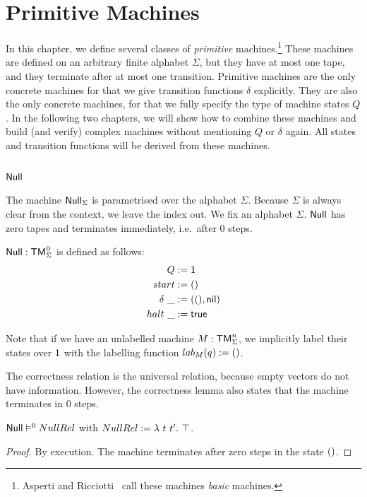 \chapter{Primitive Machines}
\label{chap:basic}

In this chapter, we define several classes of \textit{primitive} machines.\footnote{Asperti and Ricciotti~\cite{asperti2015} call these machines
  \textit{basic} machines.}  These machines are defined on an arbitrary finite alphabet $\Sigma$, but they have at most one tape, and they terminate
after at most one transition.  Primitive machines are the only concrete machines for that we give transition functions $\delta$ explicitly.  They are
also the only concrete machines, for that we fully specify the type of machine states $Q$.  In the following two chapters, we will show how to combine
these machines and build (and verify) complex machines without mentioning $Q$ or $\delta$ again.  All states and transition functions will be derived
from these machines.


\section{$\MS{Null}$}
\label{sec:Null}



The machine $\mathsf{Null}_\Sigma$ is parametrised over the alphabet $\Sigma$.  Because $\Sigma$ is always clear from the context, we leave the index out.
We fix an alphabet $\Sigma$.  $\MS{Null}$ has zero tapes and terminates immediately, i.e.\ after $0$ steps.

\begin{definition}[$\MS{Null}$][Null]
  \label{def:Null}
  $\MS{Null} : \TM_\Sigma^{\mkern+1mu 0}$ is defined as follows:
  \begin{align*}
    Q          &:= \mathsf{1} \\
    start      &:= \mathsf{()} \\
    \delta ~\_ &:= (\mathsf{()}, \mathsf{nil}) \\
    halt   ~\_ &:= \mathsf{true}
  \end{align*}
\end{definition}
Note that if we have an unlabelled machine $M:\mathsf{TM}_\Sigma^n$, we implicitly label their states over $\mathsf{1}$ with the labelling function
$lab_M(q):=\mathsf{()}$.

The correctness relation is the universal relation, because empty vectors do not have information.  However, the correctness lemma also states that
the machine terminates in $0$ steps.
\begin{lemma}
  \label{lem:Null_Sem} $\mathsf{Null} \mathrel{\vDash^{0}} NullRel$ with $NullRel := \lambda~t~t'.~ \top$.
\end{lemma}
\begin{proof}
  By execution.  The machine terminates after zero steps in the state $\mathsf{()}$.
\end{proof}

